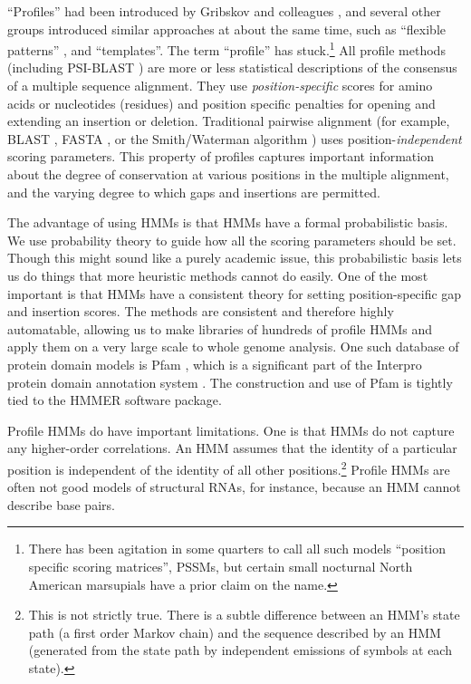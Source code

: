 ``Profiles'' had been introduced by Gribskov and colleagues
\citep{Gribskov87,Gribskov90}, and several other groups introduced
similar approaches at about the same time, such as ``flexible
patterns'' \citep{Barton90}, and
``templates''\citep{Bashford87,Taylor86}. The term ``profile'' has
stuck.\footnote{There has been agitation in some quarters to call all
  such models ``position specific scoring matrices'', PSSMs, but
  certain small nocturnal North American marsupials have a prior claim
  on the name.}  All profile methods (including PSI-BLAST
\citep{Altschul97}) are more or less statistical descriptions of the
consensus of a multiple sequence alignment. They use
\emph{position-specific} scores for amino acids or nucleotides (residues)
and position specific penalties for opening and extending an insertion or
deletion.  Traditional pairwise alignment (for example, BLAST
\citep{Altschul90}, FASTA \citep{Pearson88}, or the Smith/Waterman
algorithm \citep{Smith81}) uses position-{\em independent} scoring
parameters. This property of profiles captures important information
about the degree of conservation at various positions in the multiple
alignment, and the varying degree to which gaps and insertions are
permitted.

The advantage of using HMMs is that HMMs have a formal probabilistic
basis. We use probability theory to guide how all the scoring
parameters should be set. Though this might sound like a purely
academic issue, this probabilistic basis lets us do things that more
heuristic methods cannot do easily. One of the most important is that
HMMs have a consistent theory for setting position-specific gap and
insertion scores. The methods are consistent and therefore highly
automatable, allowing us to make libraries of hundreds of profile HMMs
and apply them on a very large scale to whole genome analysis.  One
such database of protein domain models is Pfam
\citep{Sonnhammer97,Finn10}, which is a significant part of the
Interpro protein domain annotation system \citep{Mulder03}. The
construction and use of Pfam is tightly tied to the HMMER software
package.

Profile HMMs do have important limitations. One is that HMMs do not
capture any higher-order correlations.  An HMM assumes that the
identity of a particular position is independent of the identity of
all other positions.\footnote{This is not strictly true. There is a
  subtle difference between an HMM's state path (a first order Markov
  chain) and the sequence described by an HMM (generated from the
  state path by independent emissions of symbols at each state).}
Profile HMMs are often not good models of structural RNAs, for
instance, because an HMM cannot describe base pairs.



